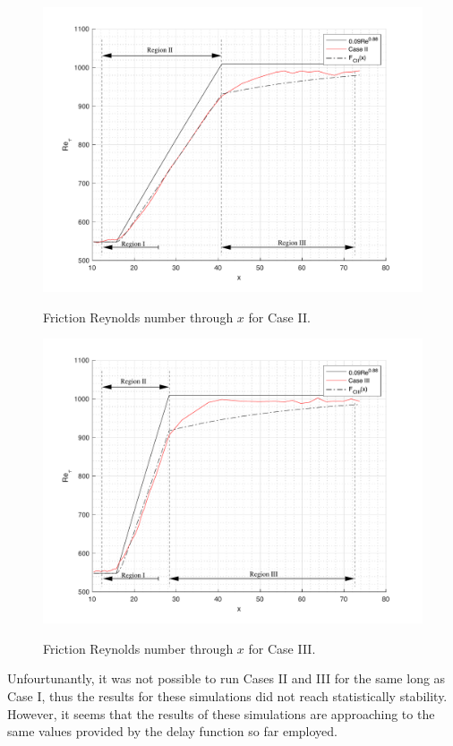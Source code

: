 \documentclass[twocolumn,10pt]{asme2e}
\begin{document}
\begin{figure}[t]
\centering
\scalebox{0.4}
{\includegraphics{convolution_CII.pdf}}
\caption{Friction Reynolds number through \(x\) for Case II.}
\label{fig:convolution_CII}
\end{figure}

\begin{figure}[t]
\centering
\scalebox{0.4}
{\includegraphics{convolution_CIII.pdf}}
\caption{Friction Reynolds number through \(x\) for Case III.}
\label{fig:convolution_CIII}
\end{figure}

Unfourtunantly, it was not possible to run Cases II and III for the same long as Case I, thus the results for these simulations did not reach statistically stability. However, it seems that the results of these simulations are approaching to the same values provided by the delay function so far employed.
\end{document}

